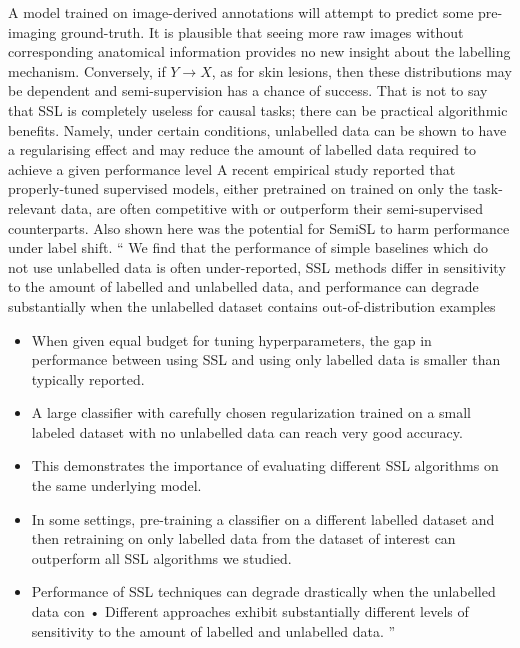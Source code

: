 \begin{itemize}
          A model trained on image-derived annotations will attempt to predict some pre-imaging
          ground-truth. 
          It is plausible that seeing more raw images without corresponding anatomical information
          provides no new insight about the labelling mechanism.
          Conversely, if \( Y \to X \), as for skin lesions, then these distributions may be
          dependent and semi-supervision has a chance of success.
          That is not to say that SSL is completely  useless for causal tasks; there can be
          practical algorithmic benefits.
          Namely, under certain conditions, unlabelled data can be shown to have a regularising
          effect and may reduce the amount of labelled data required to achieve a given performance
          level \citep{chapelle2009semi}
          A recent empirical study \citep{oliver2018realistic} reported that properly-tuned
          supervised models, either pretrained on trained on only the task-relevant data, are often
          competitive with or outperform their semi-supervised counterparts. Also shown here was
          the potential for SemiSL to harm performance under label shift.
          ``
          We find that the performance of simple baselines which do not use unlabelled data is
          often under-reported, SSL methods differ in sensitivity to the amount of labelled and
          unlabelled data, and performance can degrade substantially when the unlabelled dataset
          contains out-of-distribution examples
          \begin{itemize}
            \item When given equal budget for tuning hyperparameters, the gap in performance
              between using SSL and using only labelled data is smaller than typically reported.
            \item A large classifier with carefully chosen regularization trained on a small
              labeled dataset with no unlabelled data can reach very good accuracy.
            \item This demonstrates the importance of evaluating different SSL algorithms on the
              same underlying model.
            \item In some settings, pre-training a classifier on a different labelled dataset and
              then retraining on only labelled data from the dataset of interest can outperform all
              SSL algorithms we studied.
            \item Performance of SSL techniques can degrade drastically when the unlabelled data
              con • Different approaches exhibit substantially different levels of sensitivity to
              the amount of labelled and unlabelled data.
          ''
\end{itemize}


\end{itemize}
